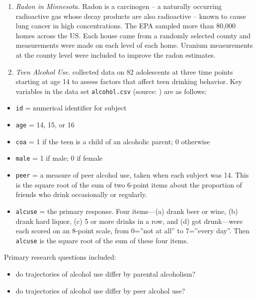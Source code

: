 \documentclass[
]{krantz}
\providecommand{\tightlist}{%
  \setlength{\itemsep}{0pt}\setlength{\parskip}{0pt}}
\begin{document}
\begin{enumerate}
\def\labelenumi{\alph{enumi}.}
\setcounter{enumi}{4}
\item
  \emph{Radon in Minnesota.} Radon is a carcinogen -- a naturally occurring radioactive gas whose decay products are also radioactive -- known to cause lung cancer in high concentrations. The EPA sampled more than 80,000 homes across the US. Each house came from a randomly selected county and measurements were made on each level of each home. Uranium measurements at the county level were included to improve the radon estimates.
\item
  \emph{Teen Alcohol Use.} \citet{Curran1997} collected data on 82 adolescents at three time points starting at age 14 to assess factors that affect teen drinking behavior. Key variables in the data set \texttt{alcohol.csv} (source: \citet{Singer2003}) are as follows:
\end{enumerate}

\begin{itemize}
\tightlist
\item
  \texttt{id} = numerical identifier for subject
\item
  \texttt{age} = 14, 15, or 16
\item
  \texttt{coa} = 1 if the teen is a child of an alcoholic parent; 0 otherwise
\item
  \texttt{male} = 1 if male; 0 if female
\item
  \texttt{peer} = a measure of peer alcohol use, taken when each subject was 14. This is the square root of the sum of two 6-point items about the proportion of friends who drink occasionally or regularly.
\item
  \texttt{alcuse} = the primary response. Four items---(a) drank beer or wine, (b) drank hard liquor, (c) 5 or more drinks in a row, and (d) got drunk---were each scored on an 8-point scale, from 0=''not at all'' to 7=''every day''. Then \texttt{alcuse} is the square root of the sum of these four items.
\end{itemize}

Primary research questions included:

\begin{itemize}
\tightlist
\item
  do trajectories of alcohol use differ by parental alcoholism?
\item
  do trajectories of alcohol use differ by peer alcohol use?
\end{itemize}
\end{document}
